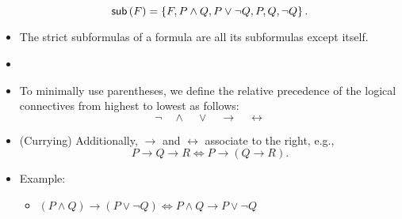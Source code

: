 \begin{itemize}
\[	\textsf{sub}\left(F\right)=\set{F,P\land Q,P\lor\lnot Q,P,Q,\lnot Q}.
	\]
	\item The strict subformulas of a formula are all its subformulas except itself.
	\item[]
	\item To minimally use parentheses, we define the relative precedence of the logical connectives from highest to lowest as follows: \[
	\lnot\quad\land\quad\lor\quad\rightarrow\quad\leftrightarrow
	\]
	\item (Currying) Additionally, $\rightarrow$ and $\leftrightarrow$ associate to the right, e.g., \[
	P\to Q\to R\iff P\to(Q\to R).
	\]
	\item Example:
	\begin{itemize}
		\item $(P\land Q)\to (P\lor\lnot Q)\iff P\land Q\to P\lor \lnot Q$
	\end{itemize}
\end{itemize}